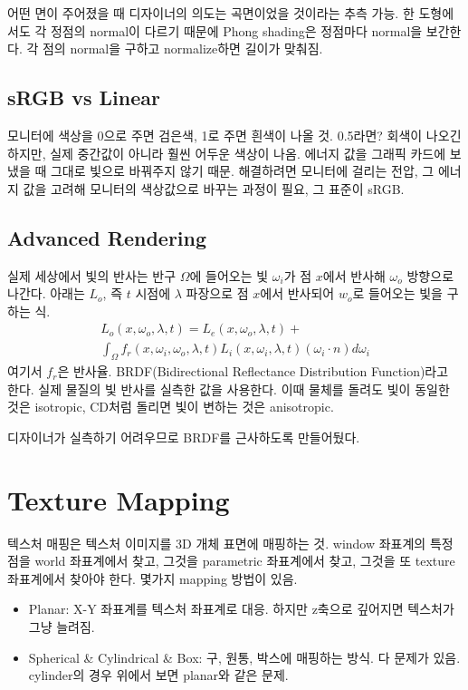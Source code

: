 어떤 면이 주어졌을 때 디자이너의 의도는 곡면이었을 것이라는 추측 가능. 한 도형에서도 각 정점의 normal이 다르기 때문에 Phong shading은 정점마다 normal을 보간한다. 각 점의 normal을 구하고 normalize하면 길이가 맞춰짐.

\subsection{sRGB vs Linear}

모니터에 색상을 0으로 주면 검은색, 1로 주면 흰색이 나올 것. 0.5라면? 회색이 나오긴 하지만, 실제 중간값이 아니라 훨씬 어두운 색상이 나옴. 에너지 값을 그래픽 카드에 보냈을 때 그대로 빛으로 바꿔주지 않기 때문. 해결하려면 모니터에 걸리는 전압, 그 에너지 값을 고려해 모니터의 색상값으로 바꾸는 과정이 필요, 그 표준이 sRGB.

\subsection{Advanced Rendering}

실제 세상에서 빛의 반사는 반구 $\Omega$에 들어오는 빛 $\omega_i$가 점 $x$에서 반사해 $\omega_o$ 방향으로 나간다. 아래는 $L_o$, 즉 $t$ 시점에 $\lambda$ 파장으로 점 $x$에서 반사되어 $w_o$로 들어오는 빛을 구하는 식.
$$
\begin{aligned}
  L_o(x, \omega_o, \lambda, t) = L_e(x, \omega_o, \lambda, t) + \\
  \int_\Omega f_r(x, \omega_i, \omega_o, \lambda, t)L_i(x, \omega_i, \lambda, t)(\omega_i \cdot n)d\omega_i
\end{aligned}
$$
여기서 $f_r$은 반사율. BRDF(Bidirectional Reflectance Distribution Function)라고 한다. 실제 물질의 빛 반사를 실측한 값을 사용한다. 이때 물체를 돌려도 빛이 동일한 것은 isotropic, CD처럼 돌리면 빛이 변하는 것은 anisotropic.

디자이너가 실측하기 어려우므로 BRDF를 근사하도록 만들어뒀다.

\section{Texture Mapping}

텍스처 매핑은 텍스처 이미지를 3D 개체 표면에 매핑하는 것. window 좌표계의 특정 점을 world 좌표계에서 찾고, 그것을 parametric 좌표계에서 찾고, 그것을 또 texture 좌표계에서 찾아야 한다. 몇가지 mapping 방법이 있음.

\begin{itemize}
  \item Planar: X-Y 좌표계를 텍스처 좌표계로 대응. 하지만 z축으로 깊어지면 텍스처가 그냥 늘려짐.
  \item Spherical \& Cylindrical \& Box: 구, 원통, 박스에 매핑하는 방식. 다 문제가 있음. cylinder의 경우 위에서 보면 planar와 같은 문제.
\end{itemize}

